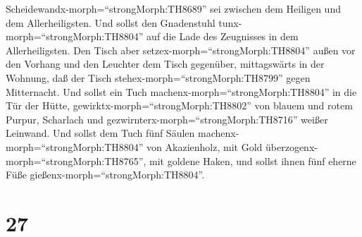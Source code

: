 Scheidewandx-morph=``strongMorph:TH8689'' sei zwischen dem Heiligen und
dem Allerheiligsten.  Und sollst den Gnadenstuhl
tunx-morph=``strongMorph:TH8804'' auf die Lade des Zeugnisses in dem
Allerheiligsten.  Den Tisch aber
setzex-morph=``strongMorph:TH8804'' außen vor den Vorhang und den
Leuchter dem Tisch gegenüber, mittagswärts in der Wohnung, daß der Tisch
stehex-morph=``strongMorph:TH8799'' gegen Mitternacht.  Und
sollst ein Tuch machenx-morph=``strongMorph:TH8804'' in die Tür der
Hütte, gewirktx-morph=``strongMorph:TH8802'' von blauem und rotem
Purpur, Scharlach und gezwirnterx-morph=``strongMorph:TH8716'' weißer
Leinwand.  Und sollst dem Tuch fünf Säulen
machenx-morph=``strongMorph:TH8804'' von Akazienholz, mit Gold
überzogenx-morph=``strongMorph:TH8765'', mit goldene Haken, und sollst
ihnen fünf eherne Füße gießenx-morph=``strongMorph:TH8804''.

\hypertarget{section-26}{%
\section{27}\label{section-26}}

